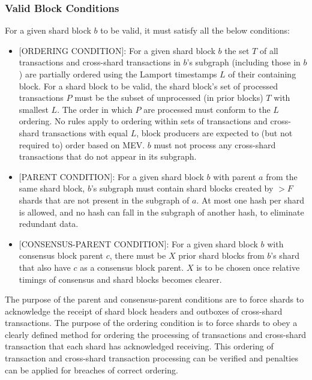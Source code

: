 \subsubsection{Valid Block Conditions}
For a given shard block $b$ to be valid, it must satisfy all the below conditions:
\begin{itemize}
	\item $[$ORDERING CONDITION$]$: For a given shard block $b$ the set $T$ of all transactions and cross-shard transactions in $b$’s subgraph (including those in $b$) are partially ordered using the Lamport timestamps $L$ of their containing block. 
	For a shard block to be valid, the shard block’s set of processed transactions $P$ must be the subset of unprocessed (in prior blocks) $T$ with smallest $L$. 
	The order in which $P$ are processed must conform to the $L$ ordering. 
	No rules apply to ordering within sets of transactions and cross-shard transactions with equal $L$, block producers are expected to (but not required to) order based on MEV. 
	$b$ must not process any cross-shard transactions that do not appear in its subgraph.
	
	\item $[$PARENT CONDITION$]$: For a given shard block $b$ with parent $a$ from the same shard block, $b$’s subgraph must contain shard blocks created by $>F$ shards that are not present in the subgraph of $a$. 
	At most one hash per shard is allowed, and no hash can fall in the subgraph of another hash, to eliminate redundant data.
	\item $[$CONSENSUS-PARENT CONDITION$]$: For a given shard block $b$ with consensus block parent $c$, there must be $X$ prior shard blocks from $b$’s shard that also have $c$ as a consensus block parent. 
	$X$ is to be chosen once relative timings of consensus and shard blocks becomes clearer.
\end{itemize}
The purpose of the parent and consensus-parent conditions are to force shards to acknowledge the receipt of shard block headers and outboxes of cross-shard transactions.
The purpose of the ordering condition is to force shards to obey a clearly defined method for ordering the processing of transactions and cross-shard transaction that each shard has acknowledged receiving. 
This ordering of transaction and cross-shard transaction processing can be verified and penalties can be applied for breaches of correct ordering.

